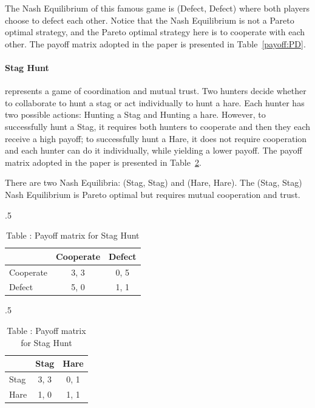 The Nash Equilibrium of this famous game is (Defect, Defect) where both players choose to defect each other. Notice that the Nash Equilibrium is not a Pareto optimal strategy, and the Pareto optimal strategy here is to cooperate with each other. The payoff matrix adopted in the paper is presented in Table~\ref{payoff:PD}.

\paragraph{Stag Hunt} represents a game of coordination and mutual trust. Two hunters decide whether to collaborate to hunt a stag or act individually to hunt a hare. Each hunter has two possible actions: Hunting a Stag and Hunting a hare. However, to successfully hunt a Stag, it requires both hunters to cooperate and then they each receive a high payoff; to successfully hunt a Hare, it does not require cooperation and each hunter can do it individually, while yielding a lower payoff. The payoff matrix adopted in the paper is presented in Table~\ref{payoff:SH}.

There are two Nash Equilibria: (Stag, Stag) and (Hare, Hare). The (Stag, Stag) Nash Equilibrium is Pareto optimal but requires mutual cooperation and trust.

\begin{table}[htb]%
    \begin{subtable}[t]{.5\textwidth}
        \centering
        \captionsetup{labelformat=empty}
            \begin{tabular}{l|cc}
                 & Cooperate & Defect \\
                \toprule
                Cooperate & 3, 3 & 0, 5  \\
                Defect & 5, 0 & 1, 1  \\
            \end{tabular}
        \caption{Table \thetable {}: Payoff matrix for Prisoner's Dilemma}
    \label{payoff:PD}
    \end{subtable}%
   \begin{subtable}[t]{.5\textwidth}
        \centering
        \captionsetup{labelformat=empty}
        \begin{tabular}{l|cc}
                 & Stag & Hare \\
                \toprule
                Stag & 3, 3 & 0, 1 \\
                Hare & 1, 0 & 1, 1  \\
            \end{tabular}
        \caption{Table \thetable {}: Payoff matrix for Stag Hunt}
    \label{payoff:SH}
    \end{subtable}
\end{table}

